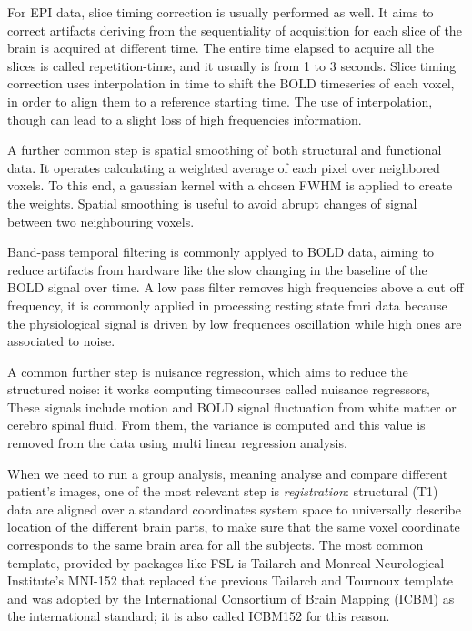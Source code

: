 \documentclass[a4paper,11pt]{article}
\begin{document}
For EPI data, slice timing correction is usually performed as well. It aims to correct artifacts deriving from the sequentiality of acquisition for each slice of the brain is acquired at different time.
The entire time elapsed to acquire all the slices is called repetition-time, and it usually is from 1 to 3 seconds.
Slice timing correction uses interpolation in time to shift the BOLD timeseries of each voxel, in order to align them to a reference starting time.
The use of interpolation, though can lead to a slight loss of high frequencies information.

A further common step is spatial smoothing of both structural and functional data. It operates calculating a weighted average of each pixel over neighbored voxels. To this end, a gaussian kernel with a chosen FWHM is applied to create the weights.
Spatial smoothing is useful to avoid abrupt changes of signal between two neighbouring voxels.

Band-pass temporal filtering is commonly applyed to BOLD data, aiming to reduce artifacts from hardware like the slow changing in the baseline of the BOLD signal over time. A low pass filter removes high frequencies above a cut off frequency, it is commonly applied in processing resting state fmri data because the physiological signal is driven by low frequences oscillation while high ones are associated to noise.

A common further step is nuisance regression, which aims to reduce the structured noise: it works computing timecourses called nuisance regressors,
These signals include motion and BOLD signal fluctuation from white matter or cerebro spinal fluid.
From them, the variance is computed and this value is removed from the data using multi linear regression analysis.

When we need to run a group analysis, meaning analyse and compare different patient's images, one of the most relevant step is \emph{registration}: structural (T1) data are aligned over a standard coordinates system space to universally describe location of the different brain parts, to make sure that the same voxel coordinate corresponds to the same brain area for all the subjects.
The most common template, provided by packages like FSL is Tailarch and Monreal Neurological Institute's MNI-152 that replaced the previous Tailarch and Tournoux template and was adopted by the International Consortium of Brain Mapping (ICBM) as the international standard; it is also called ICBM152 for this reason.
\end{document}
